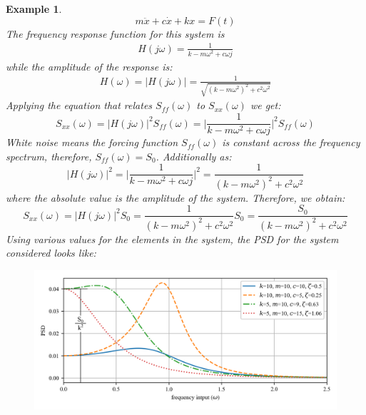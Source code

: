 \documentclass[12pt,letter]{article}
\newtheorem{ex}{Example}
\numberwithin{ex}{section} %
\newenvironment{example}{\begin{mdframed}[middlelinewidth=0.5mm]\begin{ex}\normalfont}{\end{ex}\end{mdframed}}
\numberwithin{re}{section} %
\begin{document}
\begin{example}
\begin{equation}
m\ddot{x} +c\dot{x} + kx = F(t)
\end{equation} 
The frequency response function for this system is 
\begin{eqnarray}
	H(j\omega) = \frac{1}{k-m\omega^2+c\omega j}
\end{eqnarray}
while the amplitude of the response is:
\begin{eqnarray}
H(\omega) = |H(j\omega)| = \frac{1}{\sqrt{(k-m\omega^2)^2+c^2\omega^2}}
\end{eqnarray}
Applying the equation that relates $S_{ff}(\omega)$ to $S_{xx}(\omega)$ we get:
\begin{equation}
S_{xx}(\omega) =  |H(j\omega)|^2 S_{ff}(\omega) = \bigg|\frac{1}{k-m\omega^2+c\omega j} \bigg|^2 S_{ff}(\omega) 
\end{equation}
White noise means the forcing function $S_{ff}(\omega)$ is constant across the frequency spectrum, therefore, $S_{ff}(\omega)=S_0$. Additionally as:
\begin{equation}
|H(j\omega)|^2 = \bigg|\frac{1}{k-m\omega^2+c\omega j} \bigg|^2 = \frac{1}{(k-m\omega^2)^2+c^2\omega^2}
\end{equation}
where the absolute value is the amplitude of the system. Therefore, we obtain:
\begin{equation}
S_{xx}(\omega) =  |H(j\omega)|^2 S_{0}= \frac{1}{(k-m\omega^2)^2+c^2\omega^2}S_0 = \frac{S_0}{(k-m\omega^2)^2+c^2\omega^2}
\end{equation}
Using various values for the elements in the system, the PSD for the system considered looks like:
\begin{figure}[H]
	\centering
	\includegraphics[width=1\textwidth]{../Figures/response_to_white_noise_with_annotation.png}
\end{figure}

\end{example}  
\end{document}
